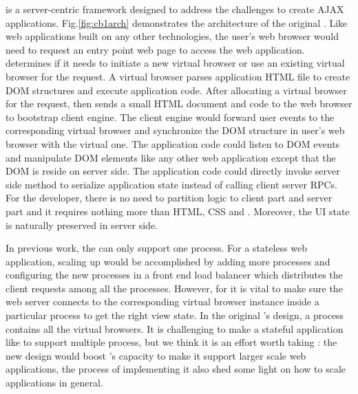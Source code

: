 \cb{} is a server-centric framework designed to address the challenges to create AJAX applications.
Fig.\ref{fig:cb1arch} demonstrates the architecture of the original \cb{}.%
Like web applications built on any other technologies, the user's web browser would need to request an entry
point web page to access the web application.
\cb{} determines if it needs to initiate a new virtual browser or use an existing
virtual browser for the request.
A virtual browser parses application HTML file to create DOM structures and
execute application \js{} code.
After allocating a virtual browser for the request,
\cb{} then sends a small HTML document and \js{} code to the web browser to
bootstrap client engine.
The client engine would forward user events to the corresponding virtual browser and
synchronize the DOM structure in user's web browser with the virtual one.
The application \js{} code could listen to DOM events and manipulate DOM elements
like any other web application except that the DOM is reside on server side.
The application code could directly invoke server side method to serialize application
state instead of calling client server RPCs. %
For the developer, there is no need to partition logic to client part and server part
and it requires nothing more than HTML, CSS and \js{}.
Moreover,
the UI state is naturally preserved in server side.


In previous work, the \cb{} can only support one process.
For a stateless web application,
scaling up would be accomplished by adding more processes and configuring the new processes
in a front end load balancer which distributes the client requests among all the processes.
However, for \cb{} it is vital to make sure the web server connects to the corresponding
virtual browser instance inside a particular process to get the right view state.
In the original \cb{}'s design, a \cb{} process contains all the virtual browsers.%
It is challenging to make a stateful application like \cb{} to support multiple process,
but we think it is an effort worth taking :
the new design would boost \cb{}'s capacity to make it support larger scale web applications,
the process of implementing it also shed some light on how to scale \nodejs{} applications in general.



\architectureoverview{}


